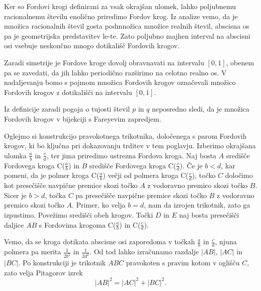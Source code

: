 \documentclass[mat1]{fmfdelo}
\begin{document}
Ker so Fordovi krogi definirani za vsak okrajšan ulomek, lahko poljubnemu racionalnemu številu enolično priredimo Fordov krog. Iz analize vemo, da je množica racionalnih števil gosta podmnožica množice realnih števil, abscisna os pa je geometrijska predstavitev le-te. Zato poljubno majhen interval na abscisni osi vsebuje neskončno mnogo dotikališč Fordovih krogov.

Zaradi simetrije je Fordove kroge dovolj obravnavati na intervalu $[0,1]$, obenem pa se zavedati, da jih lahko periodično razširimo na celotno realno os. V nadaljevanju bomo s pojmom množica Fordovih krogov označevali množico Fordovih krogov z dotikališči na intervalu $[0,1]$.

\begin{opomba}
Iz definicije zaradi pogoja o tujosti števil $p$ in $q$ neposredno sledi, da je množica Fordovih krogov v bijekciji s Fareyevim zapredjem.
\end{opomba}

Oglejmo si konstrukcijo pravokotnega trikotnika, določenega s parom Fordovih krogov, ki bo ključna pri dokazovanju trditev v tem poglavju. Izberimo okrajšana ulomka $\frac{a}{b}$ in $\frac{c}{d}$, ter jima priredimo ustrezna Fordova kroga. Naj bosta $A$ središče Fordovega kroga C($\frac{a}{b}$) in $B$ središče Fordovega kroga C($\frac{c}{d}$). Če je $b<d$, kar pomeni, da je polmer kroga C($\frac{a}{b}$) večji od polmera kroga C($\frac{c}{d}$), točko $C$ določimo kot presečišče navpične premice skozi točko $A$ z vodoravno premico skozi točko $B$. Sicer je $b>d$, točka $C$ pa presečišče navpične premice skozi točko $B$ z vodoravno premico skozi točko $A$. Primer, ko velja $b=d$, nam da izrojen trikotnik, zato ga izpustimo. Povežimo središči obeh krogov. Točki $D$ in $E$ naj bosta presečišči daljice $AB$ s Fordovima krogoma C($\frac{a}{b}$) in C($\frac{c}{d}$).

Vemo, da se kroga dotikata abscisne osi zaporedoma v točkah $\frac{a}{b}$ in $\frac{c}{d}$, njuna polmera pa merita $\frac{1}{2b^2}$ in $\frac{1}{2d^2}$. Od tod lahko izračunamo razdalje $|AB|$, $|AC|$ in $|BC|$.
Po konstrukciji je trikotnik $ABC$ pravokoten s pravim kotom v oglišču $C$, zato velja Pitagorov izrek
\begin{equation}
\label{Eq:Pitagora}
|AB|^2 = |AC|^2 + |BC|^2. 
\end{equation}
\end{document}
